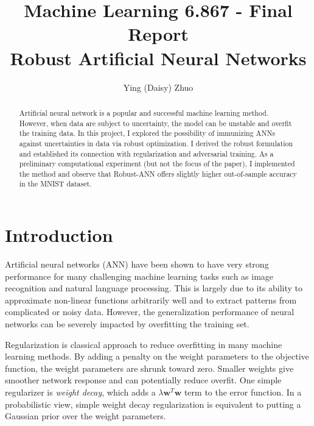 \documentclass[twoside,12pt]{article}
\newcommand{\M}[1]{\boldsymbol{\mathbf{#1}}}
\begin{document}
\title{Machine Learning 6.867 - Final Report\\Robust Artificial Neural Networks}
\author{Ying (Daisy) Zhuo}

\maketitle

\begin{abstract}
Artificial neural network is a popular and successful machine learning method. However, when data are subject to uncertainty, the model can be unstable and overfit the training data. In this project, I explored the possibility of immunizing ANNs against uncertainties in data via robust optimization. I derived the robust formulation and established its connection with regularization and adversarial training. As a preliminary computational experiment (but not the focus of the paper), I implemented the method and observe that Robust-ANN offers slightly higher out-of-sample accuracy in the MNIST dataset.

\end{abstract}


\section{Introduction}

Artificial neural networks (ANN) have been shown to have very strong performance for many challenging machine learning tasks such as image recognition and natural language processing. This is largely due to its ability to approximate non-linear functions arbitrarily well and to extract patterns from complicated or noisy data. However, the generalization performance of neural networks can be severely impacted by overfitting the training set. %

Regularization is classical approach to reduce overfitting in many machine learning methods. By adding a penalty on the weight parameters to the objective function, the weight parameters are shrunk toward zero. Smaller weights give smoother network response and can potentially reduce overfit. One simple regularizer is \emph{weight decay}, which adds a $\lambda \M w ^T \M w$ term to the error function. In a probabilistic view, simple weight decay regularization is equivalent to putting a Gaussian prior over the weight parameters. 
\end{document}
